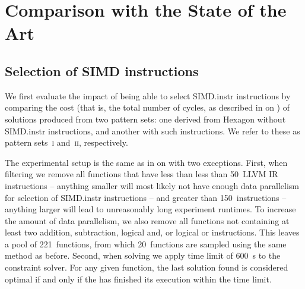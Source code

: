 %

\chapter{Comparison with the State of the Art}



\section{Selection of SIMD instructions}

\def\patternSetA{\textsc{i}}
\def\patternSetB{\textsc{ii}}

We first evaluate the impact of being able to select \gls{SIMD.instr}
\glspl{instruction} by comparing the cost (that is, the total number of cycles,
as described in  on
) of \glspl{solution} produced from two
\glspl{pattern set}: one derived from \gls{Hexagon} without \gls{SIMD.instr}
\glspl{instruction}, and another with such \glspl{instruction}.
%
We refer to these as \glspl{pattern set}~\patternSetA{} and~\patternSetB,
respectively.

The experimental setup is the same as in
 on
 with two exceptions.
%
First, when filtering we remove all \glspl{function} that have less than less
than \num{50}~\gls{LLVM} \gls{IR} \glspl{instruction} -- anything smaller will
most likely not have enough data parallelism for selection of \gls{SIMD.instr}
\glspl{instruction} -- and greater than \num{150}~\glspl{instruction} --
anything larger will lead to unreasonably long experiment runtimes.
%
To increase the amount of data parallelism, we also remove all \glspl{function}
not containing at least two addition, subtraction, logical and, or logical or
\glspl{instruction}.
%
This leaves a pool of \num{221}~\glspl{function}, from which
\num{20}~\glspl{function} are sampled using the same method as before.
%
Second, when solving we apply time limit of \SI{600}{\s} to the \gls{constraint
  solver}.
%
For any given \gls{function}, the last \gls{solution} found is considered
optimal if and only if the  has finished its
execution within the time limit.

